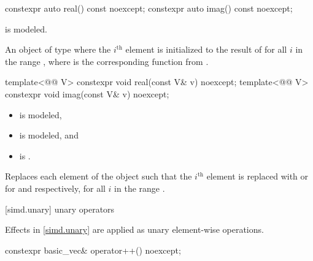 \begin{itemdecl}
constexpr auto real() const noexcept;
constexpr auto imag() const noexcept;
\end{itemdecl}

\begin{itemdescr}
\pnum
\constraints
{} is modeled.

\pnum
\returns
An object of type 
where the $i^\text{th}$ element is initialized to the result of
 for all $i$ in the range
, where  is the corresponding function
from .
\end{itemdescr}

\begin{itemdecl}
template<@@ V>
  constexpr void real(const V& v) noexcept;
template<@@ V>
  constexpr void imag(const V& v) noexcept;
\end{itemdecl}

\begin{itemdescr}
\pnum
\constraints
\begin{itemize}
 \item
    is modeled,
 \item
   is modeled, and
 \item
    is .
\end{itemize}

\pnum
\effects
Replaces each element of the  object such that the
$i^\text{th}$ element is replaced with  or 
for  and  respectively, for all $i$ in the range .
\end{itemdescr}

[simd.unary]{ unary operators}

\pnum
Effects in \ref{simd.unary} are applied as unary element-wise operations.

\begin{itemdecl}
constexpr basic_vec& operator++() noexcept;
\end{itemdecl}

